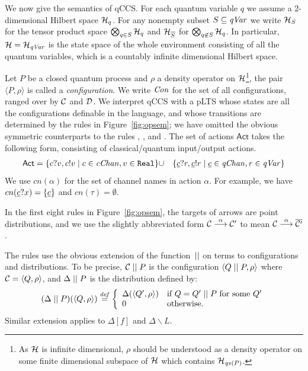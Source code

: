 \documentclass[runningheads]{llncs}
\def\>{\ensuremath{\rangle}}
\def\<{\ensuremath{\langle}}
\def\h{\ensuremath{\mathcal{H}}}
\newcommand{\define}{\stackrel{\it def}=}
\newcommand{\pdist}[1]{\overline{#1}  } %
\newcommand{\Act}{\ensuremath{\mathsf{Act}}\xspace}
\newcommand{\pair}[1]{\langle{#1}\rangle}
\newcommand{\Con}{{\it Con}}
\newcommand{\qv}{{\it qv}}
\newcommand{\qc}{\underline{c}}
\newcommand{\qVar}{{\it qVar}}
\newcommand{\cChan}{{\it cChan}}
\newcommand{\qChan}{{\it qChan}}
\newcommand{\CH}{{\cal H}}
\newcommand{\CC}{{\cal C}}
\newcommand{\CD}{{\cal D}}
\begin{document}
We now give the %
semantics of qCCS. For each quantum variable $q$ we assume a 2-dimensional Hilbert space $\CH_q$. For any nonempty subset $S\subseteq \qVar$ we write $\CH_S$ for the tensor product space $\bigotimes_{q\in S}\CH_q$ and $\CH_{\overline{S}}$ for $\bigotimes_{q\not\in S}\CH_q$. In particular, $\CH=\CH_{\qVar}$ is the state space of the whole environment consisting of all the quantum variables, which is a countably infinite dimensional Hilbert space.


Let $P$ be a closed quantum process and $\rho$ a density operator on $\CH$\footnote{As $\CH$ is infinite dimensional, $\rho$ should be understood as a density operator on some finite dimensional subspace of $\CH$ which contains $\h_{\qv(P)}$.}, the pair $\pair{P,\rho}$ is called a \emph{configuration}. We write $\Con$ for the set of all configurations, ranged over by $\CC$ and $\CD$.
We interpret qCCS with a pLTS whose states are all the configurations definable in the language,
and whose transitions are determined by the rules in Figure~\ref{fig:opsem}; we have omitted the obvious
symmetric counterparts to the rules , ,  and
.
The set of actions $\Act$ takes the following form, consisting of classical/quantum input/output actions.
\begin{eqnarray*}
\Act = 
	\sset{c?v, c!v \mid c\in \cChan, v\in\texttt{Real}}&\cup&
	\sset{\qc?r,\qc!r \mid \qc\in \qChan,r\in \qVar}
\end{eqnarray*}
We use $cn(\alpha)$ for the set of channel names in action $\alpha$. For example, we have $cn(\qc?x)=\sset{\qc}$ and $cn(\tau)=\emptyset$.

In the first eight rules in Figure~\ref{fig:opsem}, the targets of arrows are point distributions, and we use the slightly abbreviated form $\CC\ar{\alpha}\CC'$ to mean $\CC\ar{\alpha}\pdist{\CC'}$.

The rules use the obvious extension of the function~$\mathrel{||}$ on terms to configurations and distributions. To be precise,
$\CC\Cpar P$ is the configuration $\<Q\Cpar P,\rho \>$ where $\CC=\<Q,\rho\>$, and
$\Delta\mathrel{||} P$ is the distribution defined by:
\[(\Delta\Cpar P)(\pair{Q,\rho}) \define \left\{\begin{array}{ll}
\Delta(\pair{Q',\rho}) & \mbox{if $Q=Q'\Cpar P$ for some } Q'\\
0 & \mbox{otherwise.}
\end{array}\right.\]
Similar extension applies to $\Delta[f]$ and $\Delta\backslash L$.
\end{document}
